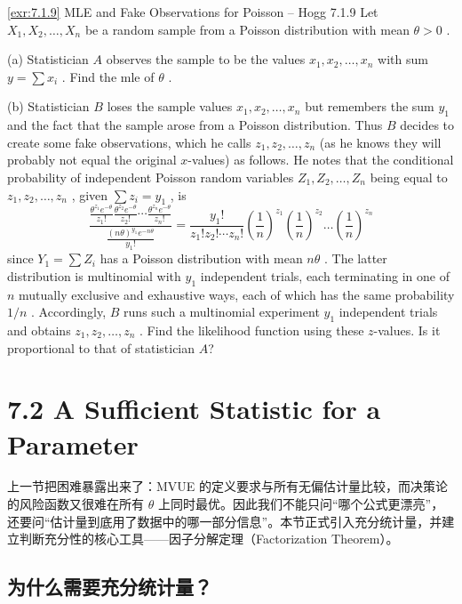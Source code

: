 \begin{exercise}{\ref{exr:7.1.9} MLE and Fake Observations for Poisson – Hogg 7.1.9}\label{exr:7.1.9}
Let $X_{1}, X_{2}, \ldots, X_{n}$ be a random sample from a Poisson distribution with mean $\theta > 0$ .

(a) Statistician $A$ observes the sample to be the values $x_{1}, x_{2}, \ldots, x_{n}$ with sum $y = \sum x_{i}$ . Find the mle of $\theta$ .

(b) Statistician $B$ loses the sample values $x_{1}, x_{2}, \ldots, x_{n}$ but remembers the sum $y_{1}$ and the fact that the sample arose from a Poisson distribution. Thus $B$ decides to create some fake observations, which he calls $z_{1}, z_{2}, \ldots, z_{n}$ (as he knows they will probably not equal the original $x$-values) as follows. He notes that the conditional probability of independent Poisson random variables $Z_{1}, Z_{2}, \ldots, Z_{n}$ being equal to $z_{1}, z_{2}, \ldots, z_{n}$ , given $\sum z_{i} = y_{1}$ , is
\[
\frac{\frac{\theta^{z_1} e^{-\theta}}{z_1!} \frac{\theta^{z_2} e^{-\theta}}{z_2!} \cdots \frac{\theta^{z_n} e^{-\theta}}{z_n!}}{\frac{(n\theta)^{y_1} e^{-n\theta}}{y_1!}} = \frac{y_1!}{z_1! z_2! \cdots z_n!} \left(\frac{1}{n}\right)^{z_1} \left(\frac{1}{n}\right)^{z_2} \dots \left(\frac{1}{n}\right)^{z_n}
\]
since $Y_{1} = \sum Z_{i}$ has a Poisson distribution with mean $n\theta$ . The latter distribution is multinomial with $y_{1}$ independent trials, each terminating in one of $n$ mutually exclusive and exhaustive ways, each of which has the same probability $1 / n$ . Accordingly, $B$ runs such a multinomial experiment $y_{1}$ independent trials and obtains $z_{1}, z_{2}, \ldots, z_{n}$ . Find the likelihood function using these $z$-values. Is it proportional to that of statistician $A$?
\end{exercise}

\section{7.2 A Sufficient Statistic for a Parameter}\label{sec:7.2}

上一节把困难暴露出来了：MVUE 的定义要求与所有无偏估计量比较，而决策论的风险函数又很难在所有 $\theta$ 上同时最优。因此我们不能只问``哪个公式更漂亮''，还要问``估计量到底用了数据中的哪一部分信息''。本节正式引入充分统计量，并建立判断充分性的核心工具——因子分解定理（Factorization Theorem）。

\subsection{为什么需要充分统计量？}

